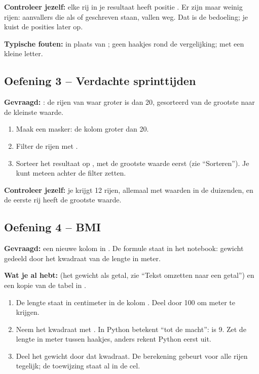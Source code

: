 \documentclass[11pt,a4paper]{article}
\begin{document}
\textbf{Controleer jezelf:} elke rij in je resultaat heeft positie
. Er zijn maar weinig rijen: aanvallers die als
 of  geschreven staan, vallen weg. Dat is de
bedoeling; je kuist de posities later op.

\textbf{Typische fouten:}  in plaats van \code{\&}; geen haakjes
rond de vergelijking;  met een kleine letter.

\subsection*{Oefening 3 -- Verdachte sprinttijden}

\textbf{Gevraagd:} : de rijen van
 waar  groter is dan 20, gesorteerd
van de grootste naar de kleinste waarde.

\begin{enumerate}
  \item Maak een masker: de kolom  groter dan 20.
  \item Filter de rijen met .
  \item Sorteer het resultaat op , met de grootste
        waarde eerst (zie ``Sorteren''). Je kunt 
        meteen achter de filter zetten.
\end{enumerate}

\textbf{Controleer jezelf:} je krijgt 12 rijen, allemaal met waarden in de
duizenden, en de eerste rij heeft de grootste waarde.

\subsection*{Oefening 4 -- BMI}

\textbf{Gevraagd:} een nieuwe kolom  in
. De formule staat in het notebook: gewicht
gedeeld door het kwadraat van de lengte in meter.

\textbf{Wat je al hebt:}  (het gewicht als
getal, zie ``Tekst omzetten naar een getal'') en een kopie van de tabel in
.

\begin{enumerate}
  \item De lengte staat in centimeter in de kolom . Deel
        door 100 om meter te krijgen.
  \item Neem het kwadraat met . In Python betekent \code{**}
        ``tot de macht'':  is 9. Zet de lengte in meter tussen
        haakjes, anders rekent Python eerst  uit.
  \item Deel het gewicht door dat kwadraat. De berekening gebeurt voor
        alle rijen tegelijk; de toewijzing  staat
        al in de cel.
\end{enumerate}
\end{document}
